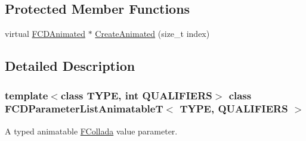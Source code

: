 \subsection*{Protected Member Functions}
\begin{DoxyCompactItemize}
\item 
virtual \hyperlink{classFCDAnimated}{FCDAnimated} $\ast$ \hyperlink{classFCDParameterListAnimatableT_a2f498f408d7fba3ea732d93ef336d487}{CreateAnimated} (size\_\-t index)
\end{DoxyCompactItemize}


\subsection{Detailed Description}
\subsubsection*{template$<$class TYPE, int QUALIFIERS$>$ class FCDParameterListAnimatableT$<$ TYPE, QUALIFIERS $>$}

A typed animatable \hyperlink{namespaceFCollada}{FCollada} value parameter. 

